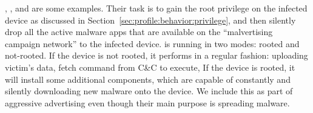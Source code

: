 ,  \cite{kemoge},  and  are some examples.
Their task is to gain the root privilege on the infected device as discussed in 
Section~\ref{sec:profile:behavior:privilege}, and then silently drop all the active 
malware apps that are available on the ``malvertising campaign network'' to the infected device.
 is running in two modes: rooted and not-rooted.
If the device is not rooted, it performs in a regular fashion: uploading victim's data, 
fetch command from C\&C to execute, \etc
If the device is rooted, it will install some additional components, which are capable of 
constantly and silently downloading new malware onto the device.
We include this as part of aggressive advertising even though their main purpose
is spreading malware.

